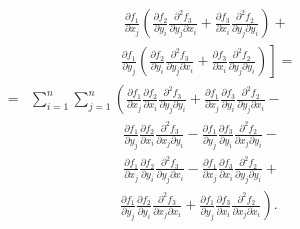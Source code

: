 \begin{align}
\begin{split}
        &\phantom{\sum_{i=1}^{n} \sum_{j=1}^{n} [}\ \ 
            \frac{\partial f_1}{\partial x_j}\left(
            \frac{\partial f_2}{\partial y_i}
            \frac{\partial^2 f_3}{\partial y_j \partial x_i} +
            \frac{\partial f_3}{\partial x_i}
            \frac{\partial^2 f_2}{\partial y_j \partial y_i}
        \right) + \\
        &\phantom{\sum_{i=1}^{n} \sum_{j=1}^{n} [}\ \left.
            \frac{\partial f_1}{\partial y_j}\left(
            \frac{\partial f_2}{\partial y_i}
            \frac{\partial^2 f_3}{\partial y_j \partial x_i} +
            \frac{\partial f_3}{\partial x_i}
            \frac{\partial^2 f_2}{\partial y_j \partial y_i}
        \right)
    \right] = \\
    = &\sum_{i=1}^{n} \sum_{j=1}^{n} \left(
        \frac{\partial f_1}{\partial x_j}
        \frac{\partial f_2}{\partial x_i}
        \frac{\partial^2 f_3}{\partial y_j \partial y_i} +
        \frac{\partial f_1}{\partial x_j}
        \frac{\partial f_3}{\partial y_i}
        \frac{\partial^2 f_2}{\partial y_j \partial x_i} - \right.\\
        &\phantom{\sum_{i=1}^{n} \sum_{j=1}^{n}}\ \ \ 
        \frac{\partial f_1}{\partial y_j}
        \frac{\partial f_2}{\partial x_i}
        \frac{\partial^2 f_3}{\partial x_j \partial y_i} - 
        \frac{\partial f_1}{\partial y_j}
        \frac{\partial f_3}{\partial y_i}
        \frac{\partial^2 f_2}{\partial x_j \partial y_i} - \\
        &\phantom{\sum_{i=1}^{n} \sum_{j=1}^{n}}\ \ \ 
        \frac{\partial f_1}{\partial x_j}
        \frac{\partial f_2}{\partial y_i}
        \frac{\partial^2 f_3}{\partial y_j \partial x_i} -
        \frac{\partial f_1}{\partial x_j}
        \frac{\partial f_3}{\partial x_i}
        \frac{\partial^2 f_2}{\partial y_j \partial y_i} + \\
        &\phantom{\sum_{i=1}^{n} \sum_{j=1}^{n}}\ \ \left.
        \frac{\partial f_1}{\partial y_j}
        \frac{\partial f_2}{\partial y_i}
        \frac{\partial^2 f_3}{\partial x_j \partial x_i} +
        \frac{\partial f_1}{\partial y_j}
        \frac{\partial f_3}{\partial x_i}
        \frac{\partial^2 f_2}{\partial x_j \partial x_i}
    \right).
\end{split}\end{align}

\newpage

